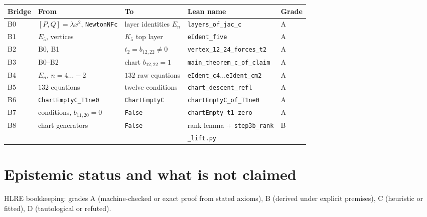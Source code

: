 \documentclass[a4paper,11pt]{article}
\theoremstyle{plain}
\theoremstyle{definition}
\theoremstyle{remark}
\begin{document}
{\small
\begin{center}
\begin{tabular}{lllll}
\toprule
\textbf{Bridge} & \textbf{From} & \textbf{To} & \textbf{Lean name} & \textbf{Grade} \\
\midrule
B0 & $[P,Q]=\lambda x^2$, \texttt{NewtonNFc} & layer identities $E_n$ & \texttt{layers\_of\_jac\_c} & A \\
B1 & $E_5$, vertices & $K_5$ top layer & \texttt{eIdent\_five} & A \\
B2 & B0, B1 & $t_2=b_{12,22}\ne0$ & \texttt{vertex\_12\_24\_forces\_t2} & A \\
B3 & B0--B2 & chart $b_{12,22}=1$ & \texttt{main\_theorem\_c\_of\_claim} & A \\
B4 & $E_n$, $n=4\dots-2$ & $132$ raw equations & \texttt{eIdent\_c4}$\dots$\texttt{eIdent\_cm2} & A \\
B5 & $132$ equations & twelve conditions & \texttt{chart\_descent\_refl} & A \\
B6 & \texttt{ChartEmptyC\_T1ne0} & \texttt{ChartEmptyC} & \texttt{chartEmptyC\_of\_T1ne0} & A \\
B7 & conditions, $b_{11,20}=0$ & \texttt{False} & \texttt{chartEmpty\_t1\_zero} & A \\
B8 & chart generators & \texttt{False} & rank lemma + \texttt{step3b\_rank} & B \\
& & & \texttt{\_lift.py} & \\
\bottomrule
\end{tabular}
\end{center}
}
\label{tab:bridges}

\section{Epistemic status and what is not claimed}\label{sec:epistemic}

HLRE bookkeeping: grades A (machine-checked or exact proof from stated axioms), B (derived under explicit premises), C (heuristic or fitted), D (tautological or refuted).
\end{document}
